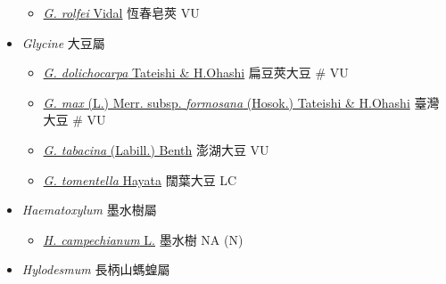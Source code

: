 \begin{itemize}
  \begin{itemize}
        \item[] \href{http://www.theplantlist.org/tpl1.1/search?q=Gleditsia+rolfei}{\textit{G. rolfei} Vidal}   恆春皂莢   VU
  \end{itemize}
 \item[] \textit{Glycine} 大豆屬
                                
  \begin{itemize}
        \item[] \href{http://www.theplantlist.org/tpl1.1/search?q=Glycine+dolichocarpa}{\textit{G. dolichocarpa} Tateishi \& H.Ohashi}   扁豆莢大豆  \# VU
        \item[] \href{http://www.theplantlist.org/tpl1.1/search?q=Glycine+max+subsp.+formosana}{\textit{G. max} (L.) Merr. subsp. \textit{formosana} (Hosok.) Tateishi \& H.Ohashi}   臺灣大豆  \# VU
        \item[] \href{http://www.theplantlist.org/tpl1.1/search?q=Glycine+tabacina}{\textit{G. tabacina} (Labill.) Benth}   澎湖大豆   VU
        \item[] \href{http://www.theplantlist.org/tpl1.1/search?q=Glycine+tomentella}{\textit{G. tomentella} Hayata}   闊葉大豆   LC
  \end{itemize}
 \item[] \textit{Haematoxylum} 墨水樹屬
                                
  \begin{itemize}
        \item[] \href{http://www.theplantlist.org/tpl1.1/search?q=Haematoxylum+campechianum}{\textit{H. campechianum} L.}   墨水樹   NA (N)
  \end{itemize}
 \item[] \textit{Hylodesmum} 長柄山螞蝗屬
                                

\end{itemize}
